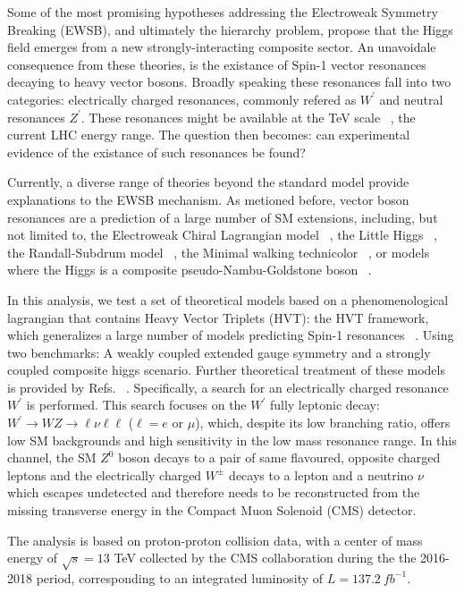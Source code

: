 Some of the most promising hypotheses addressing the Electroweak Symmetry
Breaking (EWSB), and ultimately the hierarchy problem, propose that the Higgs field
emerges from a new strongly-interacting composite sector. An unavoidale
consequence from these theories, is the existance of Spin-1 vector resonances
decaying to heavy vector bosons.  Broadly speaking these resonances
fall into  two categories: electrically
charged resonances, commonly refered as $W^{\prime}$ and
neutral resonances $Z^{\prime}$. These resonances might be available at the TeV
scale ~\cite{tevscale2014}, the current LHC energy range. The question then becomes:
can experimental evidence of the existance of such resonances be found?

Currently, a diverse range of theories
beyond the standard model provide explanations to the EWSB mechanism. As
metioned before, vector boson resonances are a prediction of a large number
of SM extensions, including, but not limited to, the Electroweak Chiral
Lagrangian model ~\cite{echl2017}, the Little Higgs
~\cite{littlehiggs2007}, the Randall-Subdrum  model ~\cite{randall1999}, the
Minimal walking technicolor ~\cite{technicolor2007}, or models where the Higgs
is a composite pseudo-Nambu-Goldstone boson ~\cite{composite2016}.

In this analysis, we test a set of theoretical models based on a phenomenological
lagrangian that contains Heavy Vector Triplets (HVT): the HVT framework, which
generalizes a large number of models predicting Spin-1 resonances ~\cite{hvt2014}.
Using two benchmarks: A weakly coupled extended gauge symmetry and a
strongly coupled composite higgs scenario. Further theoretical treatment of these models
is provided by Refs. ~\cite{hvt2014,modelA1980,modelB2011}. Specifically, a search
for an electrically charged resonance $W^{\prime}$ is performed. This search focuses
on the $W^{\prime}$ fully leptonic decay:
$W^{\prime}\rightarrow WZ \rightarrow \ell\nu \ell\ell$ ($\ell = e$ or $\mu$),
which, despite its low branching ratio, offers low SM backgrounds and high
sensitivity in the low mass resonance range. In this channel, the SM $Z^{0}$
boson decays to a pair of same flavoured, opposite charged leptons and the
electrically charged $W^{\pm}$ decays to a lepton and a neutrino $\nu$ which escapes
undetected and therefore needs to be reconstructed from the missing transverse
energy in the Compact Muon Solenoid (CMS) detector.

The analysis is based on proton-proton collision data, with a center of mass
energy of $\sqrt{s}=13$ TeV collected by the CMS collaboration during the the
2016-2018 period, corresponding to an integrated luminosity of $L=137.2~fb^{-1}$.





